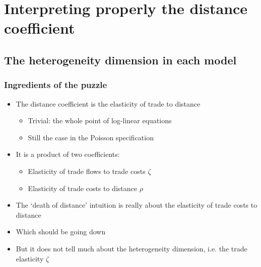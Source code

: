 \documentclass{beamer}
\begin{document}
\section{Interpreting properly the distance coefficient}
\subsection{The heterogeneity dimension in each model}
\begin{frame}\frametitle{Ingredients of the puzzle}
\begin{itemize}
\vspace{0.3cm}
\item The distance coefficient is the elasticity of trade to distance
\begin{itemize}
\item Trivial: the whole point of log-linear equations
\item Still the case in the Poisson specification
\end{itemize}
\vspace{0.3cm}
\item It is a product of two coefficients:
\begin{itemize}
\item Elasticity of trade flows to trade costs $\zeta$
\item Elasticity of trade costs to distance $\rho$
\end{itemize}
\vspace{0.3cm}
\item The `death of distance' intuition is really about the elasticity of trade costs to distance
\item Which should be going down
\item But it does not tell much about the heterogeneity dimension, i.e. the trade elasticity $\zeta$
\end{itemize}
\end{frame}
\end{document}
